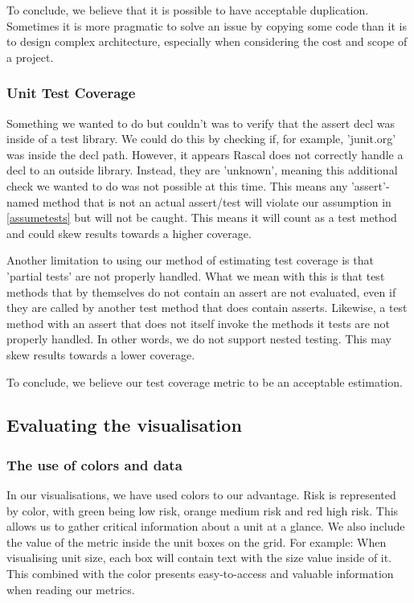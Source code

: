 \documentclass{article}
\begin{document}
To conclude, we believe that it is possible to have acceptable duplication. Sometimes it is more pragmatic to solve an issue by copying some code than it is to design complex architecture, especially when considering the cost and scope of a project.

\subsubsection{Unit Test Coverage}
Something we wanted to do but couldn't was to verify that the assert decl was inside of a test library. We could do this by checking if, for example, 'junit.org' was inside the decl path. However, it appears Rascal does not correctly handle a decl to an outside library. Instead, they are 'unknown', meaning this additional check we wanted to do was not possible at this time. This means any 'assert'-named method that is not an actual assert/test will violate our assumption in \ref{assumetests} but will not be caught. This means it will count as a test method and could skew results towards a higher coverage.

Another limitation to using our method of estimating test coverage is that 'partial tests' are not properly handled. What we mean with this is that test methods that by themselves do not contain an assert are not evaluated, even if they are called by another test method that does contain asserts. Likewise, a test method with an assert that does not itself invoke the methods it tests are not properly handled.
In other words, we do not support nested testing. This may skew results towards a lower coverage.

To conclude, we believe our test coverage metric to be an acceptable estimation.

\subsection{Evaluating the visualisation}

\subsubsection{The use of colors and data}
In our visualisations, we have used colors to our advantage. Risk is represented by color, with green being low risk, orange medium risk and red high risk. This allows us to gather critical information about a unit at a glance. We also include the value of the metric inside the unit boxes on the grid. For example: When visualising unit size, each box will contain text with the size value inside of it. This combined with the color presents easy-to-access and valuable information when reading our metrics.
\end{document}
